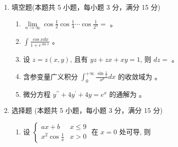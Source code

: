 
\begin{enumerate}
	\item
	填空题(本题共 5 小题，每小题 3 分，满分 15 分)
	\begin{enumerate}
		\item
	 $\lim\limits _{n \rightarrow \infty} \cos \frac{1}{2} \cos \frac{1}{4} \cdots \cos \frac{1}{2^{n}}=$ \tk{} 。
		
		
		\item
		 $\int \frac{\cos x d x}{1+e^{\sin x}}$ \tk{} 。
		
		
		\item
		设 $z=z(x, y)$, 且有 $y z+z x+x y=1$, 则 $d z=$ \tk{} 。
		
		
		\item
		含参变量广义积分 $\int_{0}^{+\infty} \frac{\sin \frac{1}{x}}{x^{p}} d x$ 的收敛域为 \tk{} 。
		
		
		\item
		微分方程 $y^{\prime \prime}+4 y^{\prime}+4 y=e^{x}$ 的通解为 \tk{} 。
		
		
		
		
	\end{enumerate}

\item 	
选择题 (本题共 5 小题，每小题 3 分，满分 15 分)	
\begin{enumerate}
	\item
设 $\left\{\begin{array}{ll}a x+b & x \leqslant 9 \\ x^{2} \cos \frac{1}{x} & x>0\end{array}\right.$ 在 $x=0$ 处可导, 则 \xzanswer{} 


\end{enumerate}
\end{enumerate}
